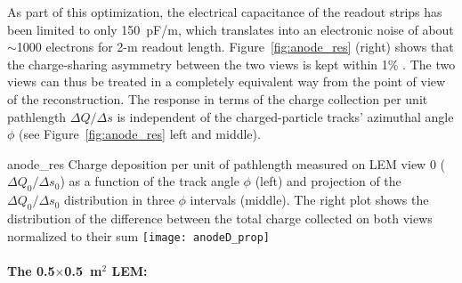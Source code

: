As part of this optimization, the electrical capacitance of the
readout strips has been limited to only 150~pF/m, which translates
into an electronic noise of about $\sim$1000 electrons for 2-m readout
length.  Figure~\ref{fig:anode_res} (right) shows that the
charge-sharing asymmetry between the two views is kept within 1\%
. The two views can thus be treated in a completely equivalent way
from the point of view of the reconstruction. The response in terms of
the charge collection per unit pathlength $\Delta Q/\Delta s$ is
independent of the charged-particle tracks' azimuthal angle $\phi$
(see Figure~\ref{fig:anode_res} left and middle).
\begin{cdrfigure}{anode_res} {Charge deposition per unit of pathlength measured on LEM view 0 
($\Delta Q_0/\Delta s_0$) as a function  of the track angle $\phi$ (left) and  projection of the  $\Delta Q_0/\Delta s_0$ distribution in three $\phi$ intervals (middle).  The right plot  shows the distribution of the difference between the total charge  collected on both views normalized to their sum}
\texttt{[image: anodeD\_prop]}
\end{cdrfigure}

\paragraph{The 0.5$\times$0.5~m$^2$ LEM:}

